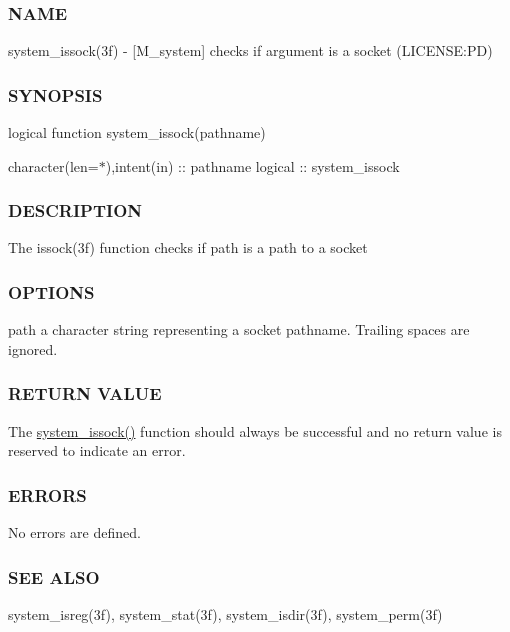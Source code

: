 \subsubsection*{N\+A\+ME}

system\+\_\+issock(3f) -\/ \mbox{[}M\+\_\+system\mbox{]} checks if argument is a socket (L\+I\+C\+E\+N\+SE\+:PD) 

\subsubsection*{S\+Y\+N\+O\+P\+S\+IS}

logical function system\+\_\+issock(pathname)

character(len=$\ast$),intent(in) \+:\+: pathname logical \+:\+: system\+\_\+issock

\subsubsection*{D\+E\+S\+C\+R\+I\+P\+T\+I\+ON}

The issock(3f) function checks if path is a path to a socket

\subsubsection*{O\+P\+T\+I\+O\+NS}

path a character string representing a socket pathname. Trailing spaces are ignored.

\subsubsection*{R\+E\+T\+U\+RN V\+A\+L\+UE}

The \mbox{\hyperlink{namespacem__system_af6eb5074fe74552bc7a5e7d00f459087}{system\+\_\+issock()}} function should always be successful and no return value is reserved to indicate an error.

\subsubsection*{E\+R\+R\+O\+RS}

No errors are defined.

\subsubsection*{S\+EE A\+L\+SO}

system\+\_\+isreg(3f), system\+\_\+stat(3f), system\+\_\+isdir(3f), system\+\_\+perm(3f)

